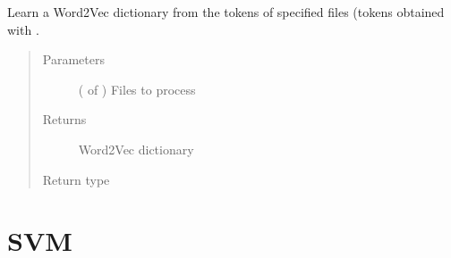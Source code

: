 \documentclass[letterpaper,10pt,english]{sphinxmanual}
\begin{document}
\begin{fulllineitems}
\label{\detokenize{learning:loacore.learning.word_embeddings.word_2_vec}}
Learn a Word2Vec dictionary from the tokens of specified files (tokens obtained with {\hyperref[\detokenize{learning:loacore.learning.word_embeddings.get_tokens_list}]{}} .
\begin{quote}\begin{description}
\item[{Parameters}] \leavevmode
{} ( of {\hyperref[\detokenize{classes:loacore.classes.classes.File}]{}}) \textendash{} Files to process

\item[{Returns}] \leavevmode
Word2Vec dictionary

\item[{Return type}] \leavevmode



\end{description}\end{quote}

\end{fulllineitems}



\section{SVM}
\label{\detokenize{learning:module-loacore.learning.svm}}\label{\detokenize{learning:svm}}
\end{document}
